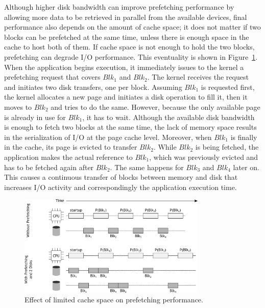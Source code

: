 Although higher disk bandwidth can improve prefetching performance by allowing more data to be retrieved in parallel from the available devices, final performance also depends on the amount of cache space; it does not matter if two 
blocks can be prefetched at the same time, unless there is enough space in the cache to host both of them. If cache space is not enough to hold the two blocks, prefetching can degrade I/O performance. This eventuality is shown 
in Figure~\ref{figure: prefetching_2}. When the application begins execution, it immediately issues to the kernel a prefetching request that covers $Blk_1$ and $Blk_2$. The kernel receives the request and initiates two disk transfers,
one per block. Assuming $Blk_1$ is requested first, the kernel allocates a new page and initiates a disk operation to fill it, then it moves to $Blk_2$ and tries to do the same. However, because the only available page is already in 
use for $Blk_1$, it has to wait. Although the available disk bandwidth is enough to fetch two blocks at the same time, the lack of memory space results in the serialization of I/O at the page cache level. Moreover, when $Blk_1$ is 
finally in the cache, its page is evicted to transfer $Blk_2$. While $Blk_2$ is being fetched, the application makes the actual reference to $Blk_1$, which was previously evicted and has to be fetched again after $Blk_2$. The same 
happens for $Blk_3$ and $Blk_4$ later on. This causes a continuous transfer of blocks between memory and disk that increases I/O activity and correspondingly the application execution time.

\begin{figure}[!htb]
\centering
\includegraphics[width=0.8\textwidth]{figures/prefetching_2}
\caption{Effect of limited cache space on prefetching performance.}
\label{figure: prefetching_2}
\end{figure}

